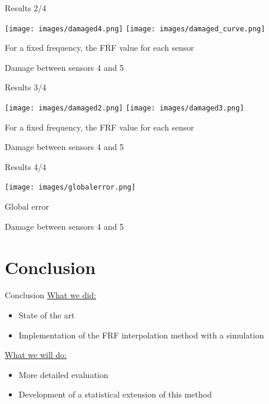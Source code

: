 \documentclass{beamer}
\begin{document}
\begin{frame}{Results 2/4}
\begin{center}
\texttt{[image: images/damaged4.png]}
\hfill
\texttt{[image: images/damaged\_curve.png]}

For a fixed frequency, the FRF value for each sensor

\vspace{5mm}

Damage between sensors 4 and 5
\end{center}

\end{frame}


\begin{frame}{Results 3/4}
\begin{center}
\texttt{[image: images/damaged2.png]}
\hfill
\texttt{[image: images/damaged3.png]}

For a fixed frequency, the FRF value for each sensor

\vspace{5mm}

Damage between sensors 4 and 5
\end{center}
\end{frame}

\begin{frame}{Results 4/4}
\begin{center}
\texttt{[image: images/globalerror.png]}

Global error

\vspace{5mm}

Damage between sensors 4 and 5
\end{center}

\end{frame}



\section{Conclusion}

\begin{frame}{Conclusion}
\underline{What we did:}
\begin{itemize}
\item State of the art
\item Implementation of the FRF interpolation method with a simulation
\end{itemize}

\underline{What we will do:}
\begin{itemize}
\item More detailed evaluation
\item Development of a statistical extension of this method
\end{itemize}



\end{frame}


  
\end{document}
